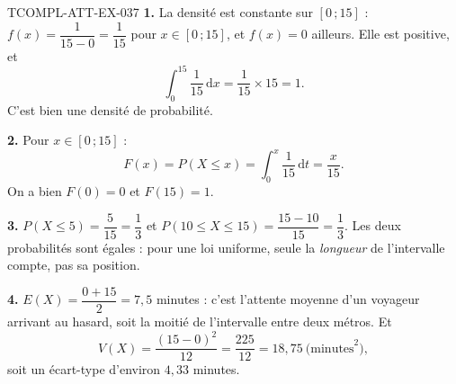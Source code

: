 \begin{corrige}{TCOMPL-ATT-EX-037}
\textbf{1.} La densité est constante sur $[0\,;15]$ : $f(x) = \dfrac{1}{15-0} = \dfrac{1}{15}$ pour $x \in [0\,;15]$, et $f(x)=0$ ailleurs. Elle est positive, et
\[
  \int_0^{15} \frac{1}{15}\,\mathrm{d}x = \frac{1}{15}\times 15 = 1 .
\]
C'est bien une densité de probabilité.

\textbf{2.} Pour $x \in [0\,;15]$ :
\[
  F(x) = P(X\leq x) = \int_0^{x} \frac{1}{15}\,\mathrm{d}t = \frac{x}{15}.
\]
On a bien $F(0)=0$ et $F(15)=1$.

\textbf{3.} $P(X\leq5) = \dfrac{5}{15} = \dfrac{1}{3}$ et $P(10\leq X\leq 15) = \dfrac{15-10}{15} = \dfrac{1}{3}$. Les deux probabilités sont égales : pour une loi uniforme, seule la \emph{longueur} de l'intervalle compte, pas sa position.

\textbf{4.} $E(X) = \dfrac{0+15}{2} = 7{,}5$ minutes : c'est l'attente moyenne d'un voyageur arrivant au hasard, soit la moitié de l'intervalle entre deux métros. Et
\[
  V(X) = \frac{(15-0)^2}{12} = \frac{225}{12} = 18{,}75 \ \text{(minutes}^2\text{)},
\]
soit un écart-type d'environ $4{,}33$ minutes.
\end{corrige}
